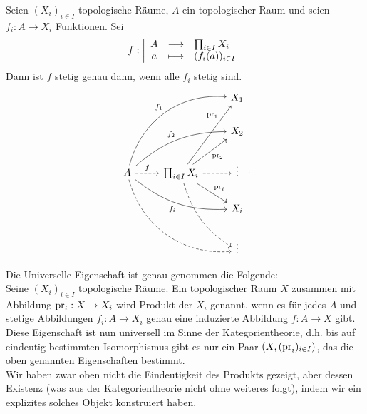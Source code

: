 
\begin{theorem}\label{thm:universelle-eigenschaft-des-produkts}
    Seien $(X_i)_{i\in I}$ topologische Räume, $A$ ein topologischer Raum und seien $f_i : A \to  X_i$ Funktionen. Sei
        \begin{equation*}
        f: \left| \begin{array}{c c l} 
        A & \longrightarrow & \prod_{i \in I} X_i \\
        a & \longmapsto &  (f_i(a))_{i \in I}
        \end{array} \right.
    \end{equation*}
    Dann ist $f$ stetig genau dann, wenn alle  $f_i$ stetig sind.
    \[
    \begin{tikzcd}
        & & X_1 \\
        & & X_2 \\
    A \ar[dashed]{r}{f} \ar[bend left = 40]{uurr}{f_1} \ar[bend left = 20]{urr}{f_2} \ar[bend right = 20,swap]{drr}{f_i} \ar[dashed, bend right = 40]{ddrr}& \prod_{i \in I}X_i \ar[near end]{uru}{\pr_1} \ar[swap]{ur}{\pr_2} \ar{dr}{\pr_i} \ar[bend right = 20,dashed]{ddr} \ar[dashed]{r}& \vdots \\
          & & X_i \\
          & & \vdots
    \end{tikzcd}
    .\] 
\end{theorem}
\begin{remark*}
    Die Universelle Eigenschaft ist genau genommen die Folgende: \\
    Seine $(X_i)_{i \in I}$ topologische Räume. Ein topologischer Raum $X$  zusammen mit Abbildung  $\operatorname{pr}_i : X \to  X_i$ wird Produkt der $X_i$ genannt, wenn es für jedes  $A$ und stetige Abbildungen  $f_i : A \to  X_i$ genau eine induzierte Abbildung $f: A \to  X$ gibt. \\
    Diese Eigenschaft ist nun universell im Sinne der Kategorientheorie, d.h. bis auf eindeutig bestimmten Isomorphismus gibt es nur ein Paar $(X, (\operatorname{pr}_i)_{i \in I})$, das die oben genannten Eigenschaften bestimmt. \\
    Wir haben zwar oben nicht die Eindeutigkeit des Produkts gezeigt, aber dessen Existenz (was aus der Kategorientheorie nicht ohne weiteres folgt), indem wir ein explizites solches Objekt konstruiert haben.
\end{remark*}
